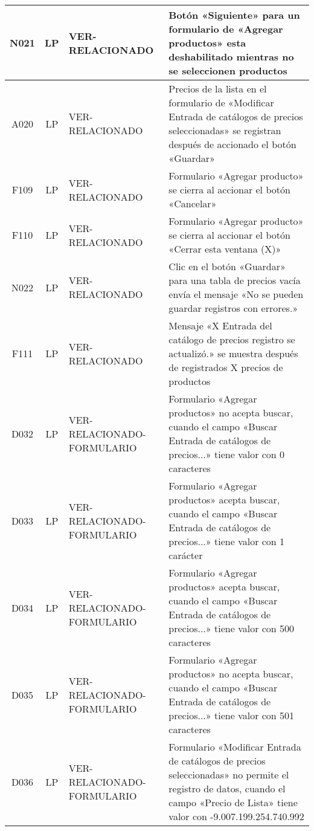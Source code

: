 \begin{landscape}
{\begin{longtable}[htb]{|c|c|p{3.8cm}|p{15.2cm}|}
\scriptsize{N021} & \scriptsize{LP} & \scriptsize{VER-RELACIONADO} & \scriptsize{Botón «Siguiente» para un formulario de «Agregar productos» esta deshabilitado mientras no se seleccionen productos} \\ \hline
\scriptsize{A020} & \scriptsize{LP} & \scriptsize{VER-RELACIONADO} & \scriptsize{Precios de la lista en el formulario de «Modificar Entrada de catálogos de precios seleccionadas» se registran después de accionado el botón «Guardar»} \\ \hline
\scriptsize{F109} & \scriptsize{LP} & \scriptsize{VER-RELACIONADO} & \scriptsize{Formulario «Agregar producto» se cierra al accionar el botón «Cancelar»} \\ \hline
\scriptsize{F110} & \scriptsize{LP} & \scriptsize{VER-RELACIONADO} & \scriptsize{Formulario «Agregar producto» se cierra al accionar el botón «Cerrar esta ventana (X)»} \\ \hline
\scriptsize{N022} & \scriptsize{LP} & \scriptsize{VER-RELACIONADO} & \scriptsize{Clic en el botón «Guardar» para una tabla de precios vacía envía el mensaje «No se pueden guardar registros con errores.»} \\ \hline
\scriptsize{F111} & \scriptsize{LP} & \scriptsize{VER-RELACIONADO} & \scriptsize{Mensaje «X Entrada del catálogo de precios registro se actualizó.» se muestra después de registrados X precios de productos} \\ \hline
\scriptsize{D032} & \scriptsize{LP} & \scriptsize{VER-RELACIONADO-FORMULARIO} & \scriptsize{Formulario «Agregar productos» no acepta buscar, cuando el campo «Buscar Entrada de catálogos de precios...» tiene valor con 0 caracteres} \\ \hline
\scriptsize{D033} & \scriptsize{LP} & \scriptsize{VER-RELACIONADO-FORMULARIO} & \scriptsize{Formulario «Agregar productos» acepta buscar, cuando el campo «Buscar Entrada de catálogos de precios...» tiene valor con 1 carácter} \\ \hline
\scriptsize{D034} & \scriptsize{LP} & \scriptsize{VER-RELACIONADO-FORMULARIO} & \scriptsize{Formulario «Agregar productos» acepta buscar, cuando el campo «Buscar Entrada de catálogos de precios...» tiene valor con 500 caracteres} \\ \hline
\scriptsize{D035} & \scriptsize{LP} & \scriptsize{VER-RELACIONADO-FORMULARIO} & \scriptsize{Formulario «Agregar productos» no acepta buscar, cuando el campo «Buscar Entrada de catálogos de precios...» tiene valor con 501 caracteres} \\ \hline
\scriptsize{D036} & \scriptsize{LP} & \scriptsize{VER-RELACIONADO-FORMULARIO} & \scriptsize{Formulario «Modificar Entrada de catálogos de precios seleccionadas» no permite el registro de datos, cuando el campo «Precio de Lista» tiene valor con -9.007.199.254.740.992} \\ \hline

\end{longtable}}
\end{landscape}
